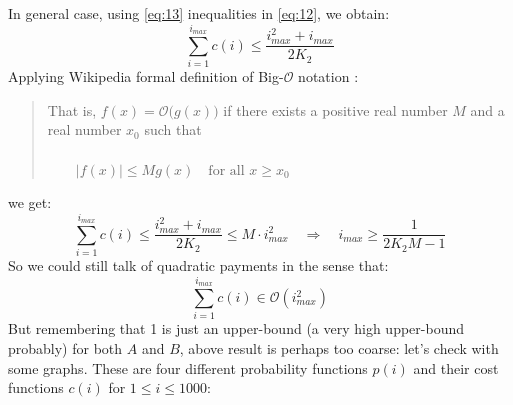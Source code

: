 \documentclass[10pt,a4paper]{article}
\begin{document}
	In general case, using \ref{eq:13} inequalities in \ref{eq:12}, we obtain:
	\begin{equation*}
		\sum_{i=1}^{i_{max}} c(i) \leq \frac{i_{max}^{2} + i_{max}}{2 K_{2}}
	\end{equation*}
	Applying Wikipedia formal definition of Big-$\mathcal{O}$ notation \cite{BigO}:
	\begin{quote}
		\begin{barobackcolor}
		That is, $f(x)=\mathcal{O}\big(g(x)\bigr)$ if there exists a positive real number $M$ and a real number $x_{0}$ such that\\
		\\
		$\quad \quad \left| f(x) \right| \leq Mg(x) \quad \textrm{for all } x \geq x_{0}$
		\end{barobackcolor}	
	\end{quote}
	we get:
	\begin{equation*}
		\sum_{i=1}^{i_{max}} c(i) \leq \frac{i_{max}^{2} + i_{max}}{2 K_{2}} \leq M \cdot i_{max}^{2} \quad \Longrightarrow \quad i_{max} \geq \frac{1}{2K_{2}M-1}
	\end{equation*}
	So we could still talk of quadratic payments in the sense that:
	\begin{equation*}
		\sum_{i=1}^{i_{max}} c(i) \in \mathcal{O}(i_{max}^2)
	\end{equation*}
	But remembering that 1 is just an upper-bound (a very high upper-bound probably) for both $A$ and $B$, above result is perhaps too coarse: let’s check with some graphs.
	These are four different probability functions $p(i)$ and their cost functions $c(i)$ for $1 \leq i \leq 1000$:
\end{document}
